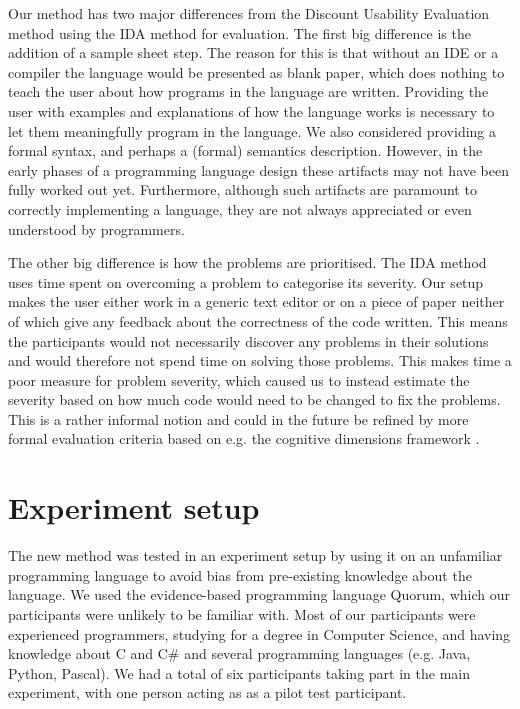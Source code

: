 \documentclass[preprint,10pt]{sigplanconf}
\begin{document}
Our method has two major differences from the Discount Usability Evaluation method using the IDA method for evaluation.
The first big difference is the addition of a sample sheet step. The reason for this is that without an IDE or a compiler the language would be presented as blank paper, which does nothing to teach the user about how programs in the language are written. Providing the user with examples and explanations of how the language works is necessary to let them meaningfully program in the language. We also considered providing a formal syntax, and perhaps a (formal) semantics description. However, in the early phases of a programming language design these artifacts may not have been fully worked out yet. Furthermore, although such artifacts are paramount to correctly implementing a language, they are not always appreciated or even understood by programmers. 

The other big difference is how the problems are prioritised. The IDA method uses time spent on overcoming a problem to categorise its severity. Our setup makes the user either work in a generic text editor or on a piece of paper neither of which give any feedback about the correctness of the code written. This means the participants would not necessarily discover any problems in their solutions and would therefore not spend time on solving those problems.
This makes time a poor measure for problem severity, which caused us to instead estimate the severity based on how much code would need to be changed to fix the problems. This is a rather informal notion and could in the future be refined by more formal evaluation criteria based on e.g. the cognitive dimensions framework \cite{blackwell2001cognitive}.

\section{Experiment setup}
The new method was tested in an experiment setup by using it on an unfamiliar programming language to avoid bias from pre-existing knowledge about the language. 
We used the evidence-based programming language Quorum, which our participants were unlikely to be familiar with. Most of our participants were experienced programmers,  studying for a degree in Computer Science, and having knowledge about C and C\# and several programming languages (e.g. Java, Python, Pascal). We had a total of six participants taking part in the main experiment, with one person acting as as a pilot test participant.
\end{document}
